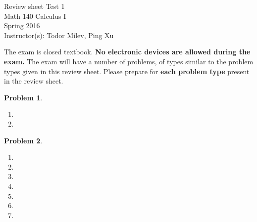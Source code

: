 \documentclass{article}
\renewcommand{\fcProblemRef}{\theproblem.\theenumi}
\newtheorem{problem}{Problem}
\begin{document}
\begin{center}
\Large
Review sheet Test 1 \\ Math 140 Calculus I \\ \normalsize Spring 2016 \\ Instructor(s): Todor Milev, Ping Xu
\end{center}



\noindent The exam is closed textbook. \textbf{No electronic devices are allowed during the exam. } The exam will have a number of problems, of types similar to the problem types given in this review sheet. Please prepare for \textbf{each problem type} present in the review sheet. %

\begin{problem}~
\begin{multicols}{2}
\begin{enumerate}[ref={\fcProblemRef}]
\item 
\item 

\end{enumerate}
\end{multicols}
\end{problem}



\begin{problem}~
\begin{multicols}{2}
\begin{enumerate}[ref={\fcProblemRef}]
\item 
\item 

\item 
\item 
\item 
\item 

\item 

\end{enumerate}
\end{multicols}
\end{problem}

\end{document}
